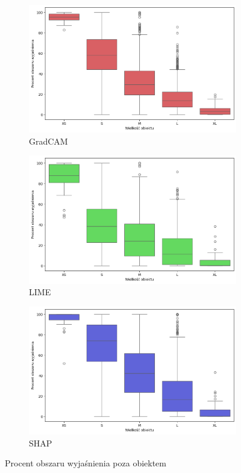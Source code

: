 \begin{figure}
	\centering
	\begin{subfigure}{0.3\textwidth}
		\centering\includegraphics[width=.9\textwidth]{img/areaincorrect_size_gradcam}
		\caption{GradCAM}  \label{rys:areaincorrect_size_gradcam}
	\end{subfigure}
	\begin{subfigure}{0.3\textwidth}
		\centering\includegraphics[width=.9\textwidth]{img/areaincorrect_size_lime}
		\caption{LIME}  \label{rys:areaincorrect_size_lime}
	\end{subfigure}
	\begin{subfigure}{0.3\textwidth}
		\centering\includegraphics[width=.9\textwidth]{img/areaincorrect_size_shap}
		\caption{SHAP}  \label{rys:areaincorrect_size_shap}
	\end{subfigure}
	\caption{Procent obszaru wyjaśnienia poza obiektem}
	\label{rys:areaincorrect_size}
\end{figure}

